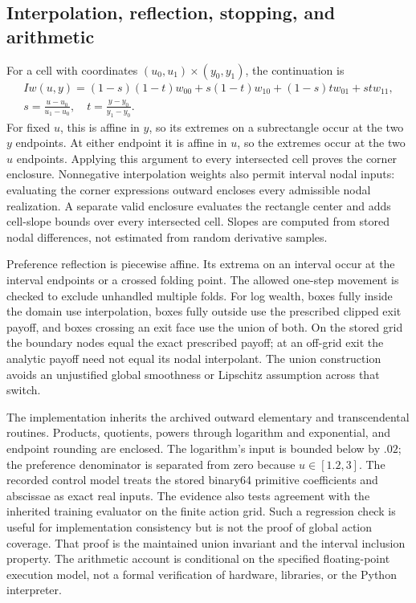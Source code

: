 \subsection{Interpolation, reflection, stopping, and arithmetic}
For a cell with coordinates $(u_0,u_1)\times(y_0,y_1)$, the continuation is
\[
 \begin{gathered}
 Iw(u,y)=(1-s)(1-t)w_{00}+s(1-t)w_{10}+(1-s)tw_{01}+st w_{11},\\
 s=\frac{u-u_0}{u_1-u_0},\quad t=\frac{y-y_0}{y_1-y_0}.
\end{gathered}
\]
For fixed $u$, this is affine in $y$, so its extremes on a subrectangle occur at the two $y$ endpoints. At either endpoint it is affine in $u$, so the extremes occur at the two $u$ endpoints. Applying this argument to every intersected cell proves the corner enclosure. Nonnegative interpolation weights also permit interval nodal inputs: evaluating the corner expressions outward encloses every admissible nodal realization. A separate valid enclosure evaluates the rectangle center and adds cell-slope bounds over every intersected cell. Slopes are computed from stored nodal differences, not estimated from random derivative samples.

Preference reflection is piecewise affine. Its extrema on an interval occur at the interval endpoints or a crossed folding point. The allowed one-step movement is checked to exclude unhandled multiple folds. For log wealth, boxes fully inside the domain use interpolation, boxes fully outside use the prescribed clipped exit payoff, and boxes crossing an exit face use the union of both. On the stored grid the boundary nodes equal the exact prescribed payoff; at an off-grid exit the analytic payoff need not equal its nodal interpolant. The union construction avoids an unjustified global smoothness or Lipschitz assumption across that switch.

The implementation inherits the archived outward elementary and transcendental routines. Products, quotients, powers through logarithm and exponential, and endpoint rounding are enclosed. The logarithm's input is bounded below by $.02$; the preference denominator is separated from zero because $u\in[1.2,3]$. The recorded control model treats the stored binary64 primitive coefficients and abscissae as exact real inputs. The evidence also tests agreement with the inherited training evaluator on the finite action grid. Such a regression check is useful for implementation consistency but is not the proof of global action coverage. That proof is the maintained union invariant and the interval inclusion property. The arithmetic account is conditional on the specified floating-point execution model, not a formal verification of hardware, libraries, or the Python interpreter.

